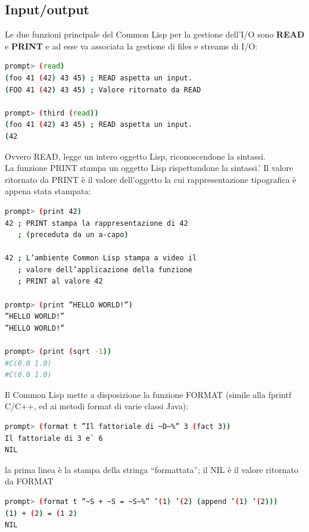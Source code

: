 \documentclass[a4paper,12pt, oneside]{book}
\begin{document}
\subsection{Input/output}
Le due funzioni principale del Common Lisp per la gestione
dell’I/O sono \textbf{READ} e \textbf{PRINT} e ad esse va associata la gestione di files e streams di I/O:
\begin{shaded}
\begin{lstlisting}[language=bash]
prompt> (read)
(foo 41 (42) 43 45) ; READ aspetta un input.
(FOO 41 (42) 43 45) ; Valore ritornato da READ

prompt> (third (read))
(foo 41 (42) 43 45) ; READ aspetta un input.
(42
\end{lstlisting}
\end{shaded}
Ovvero READ, legge un intero oggetto Lisp,
riconoscendone la sintassi.\\La funzione PRINT stampa un oggetto Lisp rispettandone la sintassi.'
Il valore ritornato da PRINT è il valore dell’oggetto la cui rappresentazione tipografica è
appena stata stampata:
\begin{shaded}
\begin{lstlisting}[language=bash]
prompt> (print 42)
42 ; PRINT stampa la rappresentazione di 42
   ; (preceduta da un a-capo)

42 ; L’ambiente Common Lisp stampa a video il
   ; valore dell’applicazione della funzione
   ; PRINT al valore 42
   
promtp> (print ”HELLO WORLD!”)
”HELLO WORLD!”
”HELLO WORLD!”

prompt> (print (sqrt -1))
#C(0.0 1.0)
#C(0.0 1.0) 
\end{lstlisting}
\end{shaded}
Il Common Lisp mette a disposizione la funzione FORMAT (simile alla
fprintf C/C++, ed ai metodi format di varie classi Java):
\begin{shaded}
\begin{lstlisting}[language=bash]
prompt> (format t ”Il fattoriale di ~D~%” 3 (fact 3))
Il fattoriale di 3 e` 6
NIL
\end{lstlisting}
\end{shaded}
la prima linea è la stampa della stringa “formattata”; il NIL è il valore
ritornato da FORMAT
\begin{shaded}
\begin{lstlisting}[language=bash]
prompt> (format t ”~S + ~S = ~S~%” ’(1) ’(2) (append ’(1) ’(2)))
(1) + (2) = (1 2)
NIL
\end{lstlisting}
\end{shaded}
\end{document}
